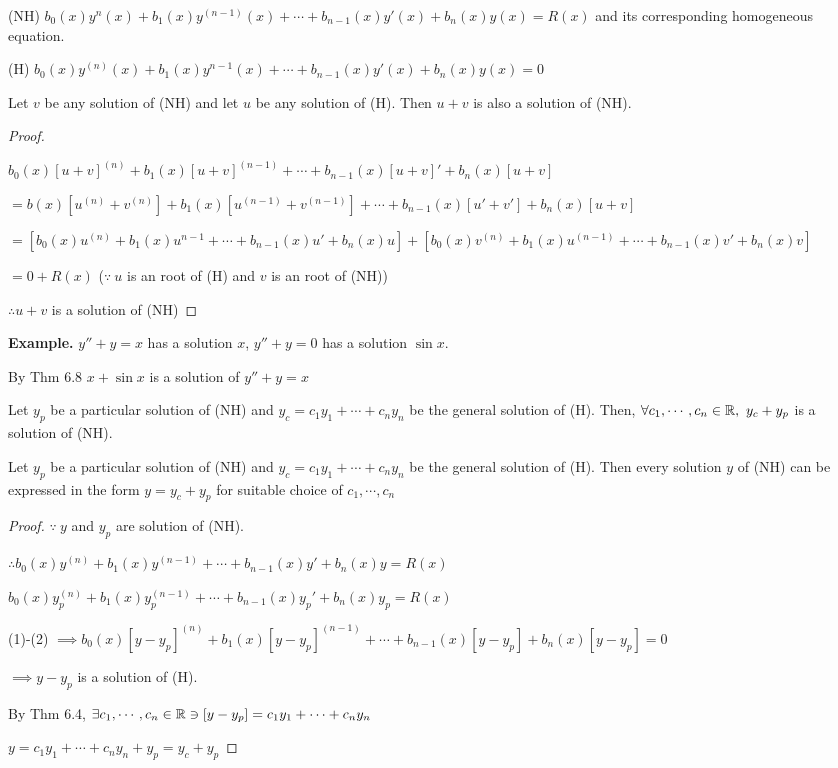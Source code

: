 (NH) $b_0(x)y^n(x) + b_1(x)y^{(n-1)}(x) + \cdots + b_{n-1}(x)y'(x) + b_n(x)y(x) = R(x)$ and its corresponding homogeneous equation.

(H) $b_0(x)y^{(n)}(x) + b_1(x)y^{n-1}(x) + \cdots + b_{n-1}(x)y'(x) + b_n(x)y(x) = 0$

\begin{thm*}
	Let $v$ be any solution of (NH) and let $u$ be any solution of (H). Then $u + v$ is also a solution of (NH).
\end{thm*}

\newpage

\begin{proof} $ $


	$b_0(x)[u + v]^{(n)} + b_1(x)[u + v]^{(n-1)} + \cdots + b_{n -1}(x)[u + v]' + b_n(x)[u + v]$
	
	$ = b(x)[u^{(n)} + v^{(n)}] + b_1(x)[u^{(n-1)} + v^{(n-1)}] + \cdots + b_{n-1}(x)[u' + v'] + b_n(x)[u + v]$
	
	$ = [b_0(x)u^{(n)} + b_1(x)u^{n-1} + \cdots + b_{n-1}(x)u' + b_n(x)u] + [b_0(x)v^{(n)} + b_1(x)u^{(n-1)} + \cdots + b_{n-1}(x)v' + b_n(x)v]$
	
	$ = 0 + R(x)$ ($\because ~ u$ is an root of (H) and $v$ is an root of (NH))
	
	$\therefore u+v$ is a solution of (NH)
\end{proof}

\textbf{Example.} $y'' + y = x$ has a solution $x$, $y'' + y = 0$ has a solution $\sin x$.

By Thm 6.8 $x + \sin x$ is a solution of $y'' + y = x$

\begin{rmk*}
	Let $y_p$ be a particular solution of (NH) and $y_c = c_1y_1+\cdots + c_ny_n$ be the general solution of (H). Then, $\forall c_1,\cdots,c_n \in \mathbb{R},~y_c + y_p$ is a solution of (NH).
\end{rmk*}

\begin{thm*}
	Let $y_p$ be a particular solution of (NH) and $y_c = c_1y_1 + \cdots + c_ny_n$ be the general solution of (H). Then every solution $y$ of (NH) can be expressed in the form $y = y_c + y_p$ for suitable choice of $c_1,\cdots,c_n$
\end{thm*}

\begin{proof}
	$\because~y$ and $y_p$ are solution of (NH).
	
	$\therefore b_0(x)y^{(n)} + b_1(x)y^{(n-1)} + \cdots + b_{n-1}(x)y' + b_n(x)y = R(x)$
	
	$b_0(x)y_p^{(n)} + b_1(x)y_p^{(n-1)} + \cdots + b_{n-1}(x)y_p' + b_n(x)y_p = R(x)$
	
	(1)-(2) $\implies b_0(x)[y-y_p]^{(n)} + b_1(x)[y-y_p]^{(n-1)} + \cdots + b_{n-1}(x)[y - y_p] + b_n(x)[y - y_p] = 0 $
	
	$\implies y - y_p$ is a solution of (H).
	
	By Thm 6.4, $\exists c_1,\cdots,c_n \in \mathbb{R} \ni [y - y_p] = c_1y_1 + \cdots + c_ny_n$
	
	$y = c_1y_1 + \cdots + c_ny_n + y_p = y_c + y_p$
\end{proof}


